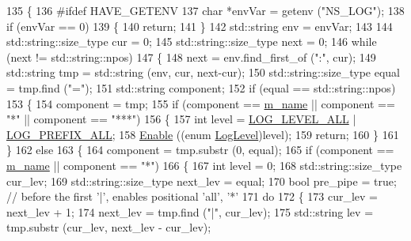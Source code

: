 \begin{DoxyCode}
135 \{
136 \textcolor{preprocessor}{#ifdef HAVE\_GETENV}
137   \textcolor{keywordtype}{char} *envVar = getenv (\textcolor{stringliteral}{"NS\_LOG"});
138   \textcolor{keywordflow}{if} (envVar == 0)
139     \{
140       \textcolor{keywordflow}{return};
141     \}
142   std::string env = envVar;
143 
144   std::string::size\_type cur = 0;
145   std::string::size\_type next = 0;
146   \textcolor{keywordflow}{while} (next != std::string::npos)
147     \{
148       next = env.find\_first\_of (\textcolor{stringliteral}{":"}, cur);
149       std::string tmp = std::string (env, cur, next-cur);
150       std::string::size\_type equal = tmp.find (\textcolor{stringliteral}{"="});
151       std::string component;
152       \textcolor{keywordflow}{if} (equal == std::string::npos)
153         \{
154           component = tmp;
155           \textcolor{keywordflow}{if} (component == \hyperlink{classns3_1_1LogComponent_af7fcce0f3820136c19e478622baf0db6}{m\_name} || component == \textcolor{stringliteral}{"*"} || component == \textcolor{stringliteral}{"***"})
156             \{
157               \textcolor{keywordtype}{int} level = \hyperlink{namespacens3_aa6464a4d69551a9cc968e17a65f39bdba022b1237a4fd1b08d034471df3c58586}{LOG\_LEVEL\_ALL} | \hyperlink{namespacens3_aa6464a4d69551a9cc968e17a65f39bdba4e8ff81bba6e1d801ef6b400cbf5c9cc}{LOG\_PREFIX\_ALL};
158               \hyperlink{classns3_1_1LogComponent_a3e0f18a35d2d3a0fb4825d369ec86bb7}{Enable} ((\textcolor{keyword}{enum} \hyperlink{namespacens3_aa6464a4d69551a9cc968e17a65f39bdb}{LogLevel})level);
159               \textcolor{keywordflow}{return};
160             \}
161         \}
162       \textcolor{keywordflow}{else}
163         \{
164           component = tmp.substr (0, equal);
165           \textcolor{keywordflow}{if} (component == \hyperlink{classns3_1_1LogComponent_af7fcce0f3820136c19e478622baf0db6}{m\_name} || component == \textcolor{stringliteral}{"*"})
166             \{
167               \textcolor{keywordtype}{int} level = 0;
168               std::string::size\_type cur\_lev;
169               std::string::size\_type next\_lev = equal;
170               \textcolor{keywordtype}{bool} pre\_pipe = \textcolor{keyword}{true};  \textcolor{comment}{// before the first '|', enables positional 'all', '*'}
171               \textcolor{keywordflow}{do}
172                 \{
173                   cur\_lev = next\_lev + 1;
174                   next\_lev = tmp.find (\textcolor{stringliteral}{"|"}, cur\_lev);
175                   std::string lev = tmp.substr (cur\_lev, next\_lev - cur\_lev);

\end{DoxyCode}
